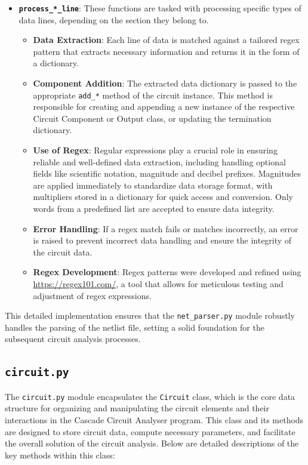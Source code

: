 \documentclass[conference]{IEEEtran}
\begin{document}
\begin{itemize}
      \item \textbf{\texttt{process\_*\_line}}: These functions are tasked with processing specific types of data lines, depending on
            the section they belong to.
            \begin{itemize}
                  \item \textbf{Data Extraction}: Each line of data is matched against a tailored regex pattern that extracts necessary
                        information and returns it in the form of a dictionary.
                  \item \textbf{Component Addition}: The extracted data dictionary is passed to the appropriate \texttt{add\_*} method
                        of the circuit instance. This method is responsible for creating and appending a new instance of the respective Circuit
                        Component or Output class, or updating the termination dictionary.
                  \item \textbf{Use of Regex}: Regular expressions play a crucial role in ensuring reliable and well-defined data extraction,
                        including handling optional fields like scientific notation, magnitude and decibel prefixes. Magnitudes are applied immediately to standardize
                        data storage format, with multipliers stored in a dictionary for quick access and conversion. Only words from a predefined
                        list are accepted to ensure data integrity.
                  \item \textbf{Error Handling}: If a regex match fails or matches incorrectly, an error is raised to prevent incorrect data
                        handling and ensure the integrity of the circuit data.
                  \item \textbf{Regex Development}: Regex patterns were developed and refined using \url{https://regex101.com/}, a tool that
                        allows for meticulous testing and adjustment of regex expressions.
            \end{itemize}
\end{itemize}

This detailed implementation ensures that the \texttt{net\_parser.py} module robustly handles the parsing of the netlist
file, setting a solid foundation for the subsequent circuit analysis processes.
\subsection{\textbf{\texttt{circuit.py}}}
The \texttt{circuit.py} module encapsulates the \texttt{Circuit} class, which is the core data structure for organizing
and manipulating the circuit elements and their interactions in the Cascade Circuit Analyser program. This class and its
methods are designed to store circuit data, compute necessary parameters, and facilitate the overall solution of the circuit
analysis. Below are detailed descriptions of the key methods within this class:
\end{document}
